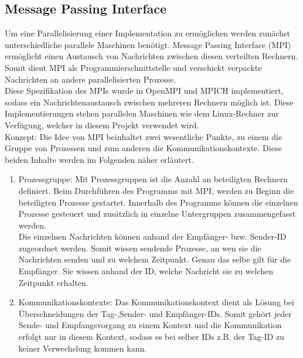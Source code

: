 \subsection{Message Passing Interface}
Um eine Parallelisierung einer Implementation zu ermöglichen werden zunächst unterschiedliche parallele Maschinen benötigt.
Message Passing Interface (MPI) ermöglicht einen Austausch von Nachrichten zwischen diesen verteilten Rechnern. Somit dient MPI als Programmierschnittstelle und verschickt verpackte Nachrichten an andere parallelisierten Prozesse.\\
Diese Spezifikation des MPIs wurde in OpenMPI und MPICH implementiert, sodass ein Nachrichtenaustausch zwischen mehreren Rechnern möglich ist. 
Diese Implementierungen stehen parallelen Maschinen wie dem Linux-Rechner zur Verfügung, welcher in diesem Projekt verwendet wird.\\ 
Konzept: Die Idee von MPI beinhaltet zwei wesentliche Punkte, zu einem die Gruppe von Prozessen und zum anderen die Kommunikationskontexte. Diese beiden Inhalte werden im Folgenden näher erläutert.
\begin{enumerate}
	\item Prozessgruppe: Mit Prozessgruppen ist die Anzahl an beteiligten Rechnern definiert. Beim Durchführen des Programms mit MPI, werden zu Beginn die beteiligten Prozesse gestartet. Innerhalb des Programms können die einzelnen Prozesse gesteuert und zusätzlich in einzelne Untergruppen zusammengefasst werden. \\
	Die einzelnen Nachrichten können anhand der Empfänger- bzw. Sender-ID zugeordnet werden. Somit wissen sendende Prozesse, an wen sie die Nachrichten senden und zu welchem Zeitpunkt. Genau das selbe gilt für die Empfänger. Sie wissen anhand der ID, welche Nachricht sie zu welchen Zeitpunkt erhalten.\\
	
	\item Kommunikationskontexte: Das Kommunikationskontext dient als Lösung bei Überschneidungen der Tag-,Sender- und Empfänger-IDs. Somit gehört jeder Sende- und Empfangsvorgang zu einem Kontext und die Kommunikation erfolgt nur in diesem Kontext, sodass es bei selber IDs z.B. der Tag-ID zu keiner Verwechslung kommen kann. 
\end{enumerate}

